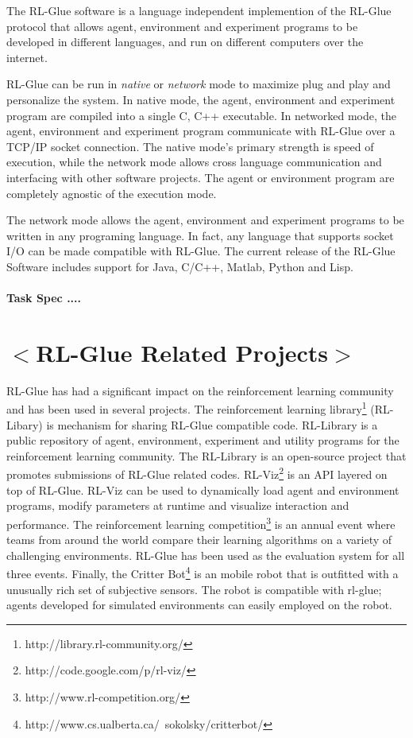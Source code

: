 \documentclass[twopage,11pt]{article}
\begin{document}
The RL-Glue software is a language independent implemention of the RL-Glue protocol  that allows agent, environment and experiment programs to be developed in different languages, and run on different computers over the internet. 

RL-Glue can be run in {\it native} or {\it network} mode to maximize plug and play and personalize the system. In native mode, the agent, environment and experiment program are compiled into a single C, C++ executable. In networked mode, the agent, environment and experiment program communicate with RL-Glue over a TCP/IP socket connection. The native mode's primary strength is speed of execution, while the network mode allows cross language communication and interfacing with other software projects. The agent or environment program are completely agnostic of the execution mode.       

The network mode allows the agent, environment and experiment programs to be written in any programing language. In fact, any language that supports socket I/O can be made compatible with RL-Glue. The current release of the RL-Glue Software includes support for Java, C/C++, Matlab, Python and Lisp.  
\\\\
{\bf Task Spec ....}



\section{$<$RL-Glue Related Projects$>$}
RL-Glue has had a significant impact on the reinforcement learning community and has been used in several projects. The reinforcement learning library\footnote{http://library.rl-community.org/} (RL-Libary) is mechanism for sharing RL-Glue compatible code. RL-Library is a public repository of agent, environment, experiment and utility programs for the reinforcement learning community. The RL-Library is an open-source project that promotes submissions of RL-Glue related codes. RL-Viz\footnote{http://code.google.com/p/rl-viz/} is an API layered on top of RL-Glue. RL-Viz can be used to dynamically load agent and environment programs, modify parameters at runtime and visualize interaction and performance.  The reinforcement learning competition\footnote{http://www.rl-competition.org/} is an annual event where teams from around the world compare their learning algorithms on a variety of challenging environments. RL-Glue has been used as the evaluation system for all three events. Finally, the Critter Bot\footnote{http://www.cs.ualberta.ca/~sokolsky/critterbot/} is an mobile robot that is outfitted with a unusually rich set of subjective sensors. The robot is compatible with rl-glue; agents developed for simulated environments can easily employed on the robot.
\end{document}
